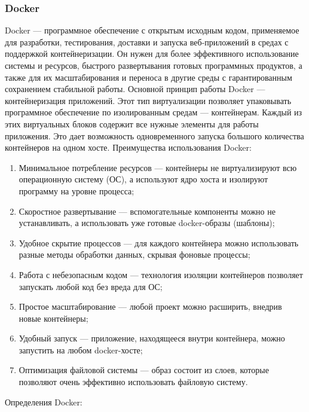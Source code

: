 \subsubsection{Docker}
	Docker — программное обеспечение с открытым исходным кодом, применяемое для разработки, тестирования, доставки и запуска веб-приложений в средах с поддержкой контейнеризации. Он нужен для более эффективного использование системы и ресурсов, быстрого развертывания готовых программных продуктов, а также для их масштабирования и переноса в другие среды с гарантированным сохранением стабильной работы.
	Основной принцип работы Docker — контейнеризация приложений. Этот тип виртуализации позволяет упаковывать программное обеспечение по изолированным средам — контейнерам. Каждый из этих виртуальных блоков содержит все нужные элементы для работы приложения. Это дает возможность одновременного запуска большого количества контейнеров на одном хосте.
	Преимущества использования Docker:
\begin{enumerate}
	\item Минимальное потребление ресурсов — контейнеры не виртуализируют всю операционную систему (ОС), а используют ядро хоста и изолируют программу на уровне процесса;
	\item Скоростное развертывание — вспомогательные компоненты можно не устанавливать, а использовать уже готовые docker-образы (шаблоны);
	\item Удобное скрытие процессов — для каждого контейнера можно использовать разные методы обработки данных, скрывая фоновые процессы;
	\item Работа с небезопасным кодом — технология изоляции контейнеров позволяет запускать любой код без вреда для ОС;
	\item Простое масштабирование — любой проект можно расширить, внедрив новые контейнеры;
	\item Удобный запуск — приложение, находящееся внутри контейнера, можно запустить на любом docker-хосте;
	\item Оптимизация файловой системы — образ состоит из слоев, которые позволяют очень эффективно использовать файловую систему.
\end{enumerate}
	Определения Docker:
